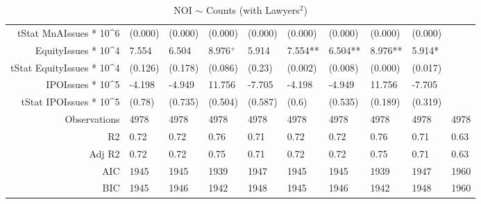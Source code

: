 \begin{table}[ht]
\begin{tabular}{rlllllllll}
  tStat MnAIssues * 10^6 & (0.000) & (0.000) & (0.000) & (0.000) & (0.000) & (0.000) & (0.000) & (0.000) &  \\ 
  EquityIssues * 10^4 & 7.554 & 6.504 & 8.976$^{+}$ & 5.914 & 7.554** & 6.504** & 8.976** & 5.914* &  \\ 
  tStat EquityIssues * 10^4 & (0.126) & (0.178) & (0.086) & (0.23) & (0.002) & (0.008) & (0.000) & (0.017) &  \\ 
  IPOIssues * 10^5 & -4.198 & -4.949 & 11.756 & -7.705 & -4.198 & -4.949 & 11.756 & -7.705 &  \\ 
  tStat IPOIssues * 10^5 & (0.78) & (0.735) & (0.504) & (0.587) & (0.6) & (0.535) & (0.189) & (0.319) &  \\ 
  Observations & 4978 & 4978 & 4978 & 4978 & 4978 & 4978 & 4978 & 4978 & 4978 \\ 
  R2 & 0.72 & 0.72 & 0.76 & 0.71 & 0.72 & 0.72 & 0.76 & 0.71 & 0.63 \\ 
  Adj R2 & 0.72 & 0.72 & 0.75 & 0.71 & 0.72 & 0.72 & 0.75 & 0.71 & 0.63 \\ 
  AIC & 1945 & 1945 & 1939 & 1947 & 1945 & 1945 & 1939 & 1947 & 1960 \\ 
  BIC & 1945 & 1946 & 1942 & 1948 & 1945 & 1946 & 1942 & 1948 & 1960 \\ 
   \hline
\end{tabular}
\caption{NOI $\sim$ Counts (with Lawyers$^2$)} 
\end{table}
